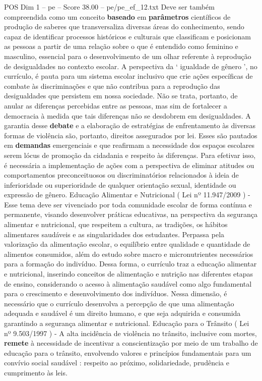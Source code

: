 \begin{textsample}{POS Dim 1 – pe – Score 38.00 – pe/pe\_ef\_12.txt}
Deve ser também compreendida como um conceito \textbf{baseado} em \textbf{parâmetros} científicos de produção de saberes que transversaliza diversas áreas do conhecimento, sendo capaz de identificar processos históricos e culturais que classificam e posicionam as pessoas a partir de uma relação sobre o que é entendido como feminino e masculino, essencial para o desenvolvimento de um olhar referente à reprodução de desigualdades no contexto escolar.
A perspectiva da ‘ igualdade de gênero ’, no currículo, é pauta para um sistema escolar inclusivo que crie ações específicas de combate às discriminações e que não contribua para a reprodução das desigualdades que persistem em nossa sociedade.
Não se trata, portanto, de anular as diferenças percebidas entre as pessoas, mas sim de fortalecer a democracia à medida que tais diferenças não se desdobrem em desigualdades.
A garantia desse \textbf{debate} e a elaboração de estratégias de enfrentamento às diversas formas de violência são, portanto, direitos assegurados por lei.
Esses são pautados em \textbf{demandas} emergenciais e que reafirmam a necessidade dos espaços escolares serem lócus de promoção da cidadania e respeito às diferenças.
Para efetivar isso, é necessária a implementação de ações com a perspectiva de eliminar atitudes ou comportamentos preconceituosos ou discriminatórios relacionados à ideia de inferioridade ou superioridade de qualquer orientação sexual, identidade ou expressão de gênero.
Educação Alimentar e Nutricional ( Lei nº 11.947/2009 ) - Esse tema deve ser vivenciado por toda comunidade escolar de forma contínua e permanente, visando desenvolver práticas educativas, na perspectiva da segurança alimentar e nutricional, que respeitem a cultura, as tradições, os hábitos alimentares saudáveis e as singularidades dos estudantes.
Perpassa pela valorização da alimentação escolar, o equilíbrio entre qualidade e quantidade de alimentos consumidos, além do estudo sobre macro e micronutrientes necessários para a formação do indivíduo.
Dessa forma, o currículo traz a educação alimentar e nutricional, inserindo conceitos de alimentação e nutrição nas diferentes etapas de ensino, considerando o acesso à alimentação saudável como algo fundamental para o crescimento e desenvolvimento dos indivíduos.
Nessa dimensão, é necessário que o currículo desenvolva a percepção de que uma alimentação adequada e saudável é um direito humano, e que seja adquirida e consumida garantindo a segurança alimentar e nutricional.
Educação para o Trânsito ( Lei nº 9.503/1997 ) - A alta incidência de violência no trânsito, inclusive com mortes, \textbf{remete} à necessidade de incentivar a conscientização por meio de um trabalho de educação para o trânsito, envolvendo valores e princípios fundamentais para um convívio social saudável : respeito ao próximo, solidariedade, prudência e cumprimento às leis.

\end{textsample}
